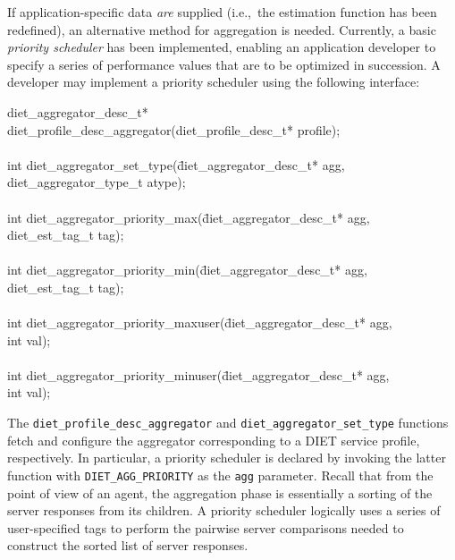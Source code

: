 If application-specific data \emph{are} supplied (i.e.,~the
estimation function has been redefined), an alternative method for
aggregation is needed.  Currently, a basic
\emph{priority scheduler} has been implemented, enabling an
application developer to specify a series of performance values that
are to be optimized in succession.  A developer may implement a
priority scheduler using the following interface:
\begin{code}
\begin{tabbing}
diet\_aggregator\_desc\_t* \\
diet\_profile\_desc\_aggregator(diet\_profile\_desc\_t* profile); \\
\\
int diet\_aggregator\_set\_type(\=diet\_aggregator\_desc\_t* agg, \\
\> diet\_aggregator\_type\_t atype); \\
\\
int diet\_aggregator\_priority\_max(\=diet\_aggregator\_desc\_t* agg, \\
\> diet\_est\_tag\_t tag); \\
\\
int diet\_aggregator\_priority\_min(\=diet\_aggregator\_desc\_t* agg, \\
\> diet\_est\_tag\_t tag); \\
\\
int diet\_aggregator\_priority\_maxuser(\=diet\_aggregator\_desc\_t* agg, \\
\> int val); \\
\\
int diet\_aggregator\_priority\_minuser(\=diet\_aggregator\_desc\_t* agg, \\
\> int val); \\
\end{tabbing}
\end{code}
The \texttt{diet\_profile\_desc\_aggregator} and
\texttt{diet\_aggregator\_set\_type} functions fetch and configure the
aggregator corresponding to a DIET service profile, respectively.
In particular, a priority scheduler is declared by invoking the latter
function with \texttt{DIET\_AGG\_PRIORITY} as the \texttt{agg}
parameter.
Recall that from the point of view of an agent, the aggregation phase
is essentially a sorting of the server responses from its children.
A priority scheduler logically uses a series of user-specified tags to
perform the pairwise server comparisons needed to construct the
sorted list of server responses.

